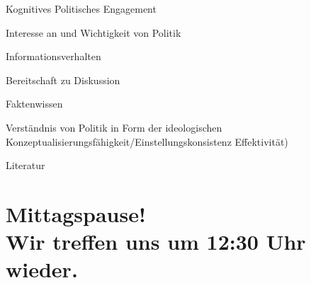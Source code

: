 \documentclass[11pt]{beamer}
\begin{document}
\begin{frame}{Kognitives Politisches Engagement \parencite{Westle2020}}
	\begin{nolist}
		\item Interesse an und Wichtigkeit von Politik
		\item Informationsverhalten
		\item Bereitschaft zu Diskussion
		\item Faktenwissen
		\item Verständnis von Politik in Form der ideologischen Konzeptualisierungsfähigkeit/Einstellungskonsistenz Effektivität)
	\end{nolist}
\end{frame}

\renewcommand*{\bibfont}{\scriptsize}

\begin{frame}[allowframebreaks]{Literatur}
	\nocite{*}
	\printbibliography[heading = none]
\end{frame}

\section{Mittagspause! \\ Wir treffen uns um 12:30 Uhr wieder.}
\end{document}
